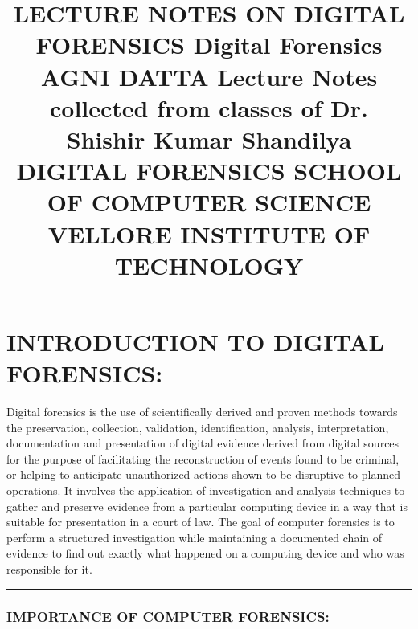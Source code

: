 \documentclass[10pt,british,english]{article}
\begin{document}
\title{\begin{center}          
   \vspace*{1cm}                   
\Huge         
\textbf{LECTURE NOTES ON DIGITAL FORENSICS}                     
\vspace{0.5cm}          
\LARGE          
Digital Forensics                  
\vspace{1.5cm}                     
\textbf{AGNI DATTA}                    
\vfill               
Lecture Notes collected from classes of Dr. Shishir Kumar Shandilya\\ 
DIGITAL FORENSICS             
\vspace{0.8cm}                                   
\Large          
SCHOOL OF COMPUTER SCIENCE\\          
VELLORE INSTITUTE OF TECHNOLOGY\\           
\end{center}}

\maketitle
\pagebreak{}

\tableofcontents{}

\newpage{}

\part{INTRODUCTION TO DIGITAL FORENSICS:}

Digital forensics is the use of scientifically derived and proven
methods towards the preservation, collection, validation, identification,
analysis, interpretation, documentation and presentation of digital
evidence derived from digital sources for the purpose of facilitating
the reconstruction of events found to be criminal, or helping to anticipate
unauthorized actions shown to be disruptive to planned operations.
It involves the application of investigation and analysis techniques
to gather and preserve evidence from a particular computing device
in a way that is suitable for presentation in a court of law. The
goal of computer forensics is to perform a structured investigation
while maintaining a documented chain of evidence to find out exactly
what happened on a computing device and who was responsible for it.

\rule[0.5ex]{1\columnwidth}{1pt}

\section{IMPORTANCE OF COMPUTER FORENSICS:}
\end{document}
